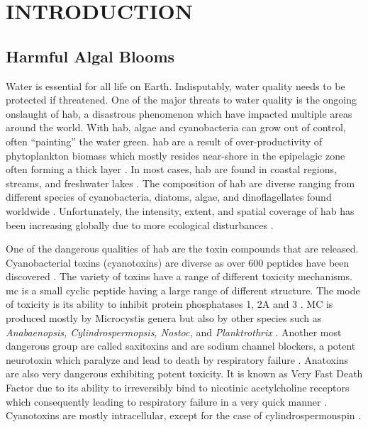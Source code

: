 
\chapter{INTRODUCTION}
\section{Harmful Algal Blooms}

Water is essential for all life on Earth. Indisputably, water quality needs to be protected if threatened. One of the major threats to water quality is the ongoing onslaught of \gls{hab}, a disastrous phenomenon which have impacted multiple areas around the world. With \gls{hab}, algae and cyanobacteria can grow out of control, often ``painting'' the water green. \gls{hab} are a result of over-productivity of phytoplankton biomass which mostly resides near-shore in the epipelagic zone often forming a thick layer \cite{moore_richard_cyanobacterial_1993}.  In most cases, \gls{hab} are found in coastal regions, streams, and freshwater lakes \cite{rastogi_cyanotoxin-microcystins:_2014}. The composition of
\gls{hab} are diverse ranging from  different species of cyanobacteria, diatoms, algae, and dinoflagellates found worldwide \cite{dittmann_cyanobacterial_2012}.  Unfortunately, the intensity, extent, and spatial coverage of \gls{hab} has been increasing globally due to more ecological disturbances \cite{codd_cyanobacterial_1999}. 

One of the dangerous qualities of \gls{hab} are the toxin compounds that are released. Cyanobacterial toxins (cyanotoxins) are diverse as over 600 peptides have been discovered \cite{welker_cyanobacterial_2006}. The variety of toxins have a range of different toxicity mechanisms.
\gls{mc} is a small cyclic peptide having a large range of different structure. The mode of toxicity is its ability to inhibit protein phosphatases 1, 2A and 3 \cite{moore_richard_cyanobacterial_1993}. MC is produced mostly by Microcystis genera but also by other species such as \emph{Anabaenopsis, Cylindrospermopsis, Nostoc,} and \emph{Planktrothrix} \cite{rastogi_cyanotoxin-microcystins:_2014, davis_phylogenies_2014}. 
Another most dangerous group are called saxitoxins and are sodium channel blockers, a potent neurotoxin which paralyze and lead to death by respiratory failure \cite{moore_richard_cyanobacterial_1993}.
Anatoxins are also very dangerous exhibiting potent toxicity. It is known as Very Fast Death Factor due to its ability to irreversibly bind to nicotinic acetylcholine receptors which consequently leading to respiratory failure in a very quick manner \cite{codd_cyanobacterial_1999, moore_richard_cyanobacterial_1993}. Cyanotoxins are mostly intracellular, except for the case of cylindrospermonspin \cite{rastogi_cyanotoxin-microcystins:_2014}.

